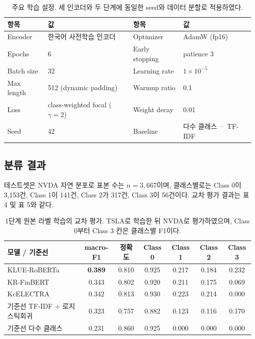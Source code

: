 \documentclass[11pt]{article}
\begin{document}
\begin{table}[H]
\centering
\begin{tabular}{@{}llll@{}}
\toprule
\textbf{항목} & \textbf{값} & \textbf{항목} & \textbf{값} \\
\midrule
Encoder & 한국어 사전학습 인코더 & Optimizer & AdamW (fp16) \\
Epochs & 6 & Early stopping & patience 3 \\
Batch size & 32 & Learning rate & $1\!\times\!10^{-5}$ \\
Max length & 512 (dynamic padding) & Warmup ratio & 0.1 \\
Loss & class-weighted focal ($\gamma{=}2$) & Weight decay & 0.01 \\
Seed & 42 & Baseline & 다수 클래스 · TF-IDF \\
\bottomrule
\end{tabular}
\caption{주요 학습 설정. 세 인코더와 두 단계에 동일한 seed와 데이터 분할로 적용하였다.}
\end{table}

\subsection{분류 결과}

테스트셋은 NVDA 자연 분포로 표본 수는 $n{=}3{,}667$이며, 클래스별로는 Class 0이 3,153건, Class 1이 141건, Class 2가 317건, Class 3이 56건이다. 교차 평가 결과는 표 4 및 표 5와 같다.

\begin{table}[H]
\centering
\begin{tabular}{@{}lcccccc@{}}
\toprule
\textbf{모델 / 기준선} & \textbf{macro-F1} & \textbf{정확도} & \textbf{Class 0} & \textbf{Class 1} & \textbf{Class 2} & \textbf{Class 3} \\
\midrule
KLUE-RoBERTa            & \textbf{0.389} & 0.810 & 0.925 & 0.217 & 0.184 & 0.232 \\
KR-FinBERT              & 0.343 & 0.802 & 0.920 & 0.211 & 0.175 & 0.069 \\
KcELECTRA               & 0.342 & 0.813 & 0.930 & 0.223 & 0.214 & 0.000 \\
\addlinespace[1pt]\midrule\addlinespace[1pt]
기준선 TF-IDF + 로지스틱회귀 & 0.323 & 0.757 & 0.882 & 0.123 & 0.116 & 0.170 \\
기준선 다수 클래스          & 0.231 & 0.860 & 0.925 & 0.000 & 0.000 & 0.000 \\
\bottomrule
\end{tabular}
\caption{1단계 원본 라벨 학습의 교차 평가. TSLA로 학습한 뒤 NVDA로 평가하였으며, Class 0부터 Class 3 칸은 클래스별 F1이다.}
\end{table}
\end{document}
